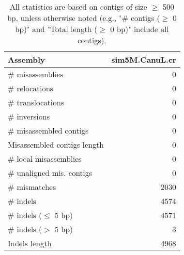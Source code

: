 \documentclass[12pt,a4paper]{article}
\begin{document}
\begin{table}[ht]
\begin{center}
\caption{All statistics are based on contigs of size $\geq$ 500 bp, unless otherwise noted (e.g., "\# contigs ($\geq$ 0 bp)" and "Total length ($\geq$ 0 bp)" include all contigs).}
\begin{tabular}{|l*{1}{|r}|}
\hline
Assembly & sim5M.CanuL.cr \\ \hline
\# misassemblies & 0 \\ \hline
\hspace{5mm}\# relocations & 0 \\ \hline
\hspace{5mm}\# translocations & 0 \\ \hline
\hspace{5mm}\# inversions & 0 \\ \hline
\# misassembled contigs & 0 \\ \hline
Misassembled contigs length & 0 \\ \hline
\# local misassemblies & 0 \\ \hline
\# unaligned mis. contigs & 0 \\ \hline
\# mismatches & 2030 \\ \hline
\# indels & 4574 \\ \hline
\hspace{5mm}\# indels ($\leq$ 5 bp) & 4571 \\ \hline
\hspace{5mm}\# indels ($>$ 5 bp) & 3 \\ \hline
Indels length & 4968 \\ \hline
\end{tabular}
\end{center}
\end{table}
\end{document}
